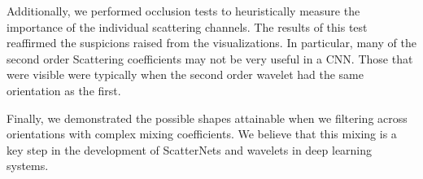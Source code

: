 Additionally, we performed occlusion tests to heuristically measure the
importance of the individual scattering channels. The results of this test
reaffirmed the suspicions raised from the visualizations. In particular, many of
the second order Scattering coefficients may not be very useful in a CNN. Those
that were visible were typically when the second order wavelet had the same
orientation as the first.

Finally, we demonstrated the possible shapes attainable when we filtering 
across orientations with complex mixing coefficients. We believe that this 
mixing is a key step in the development of ScatterNets and wavelets in deep
learning systems.

